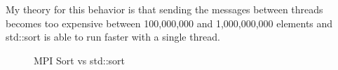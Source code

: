 \documentclass{article}
\begin{document}
My theory for this behavior is that sending the messages between threads becomes too expensive between 100,000,000 and 1,000,000,000 elements and std::sort is able to run faster with a single thread.


\begin{figure}[!htbp]
    \centering
    \caption{MPI Sort vs std::sort}
    \label{fig:graph}
\end{figure}
\end{document}
